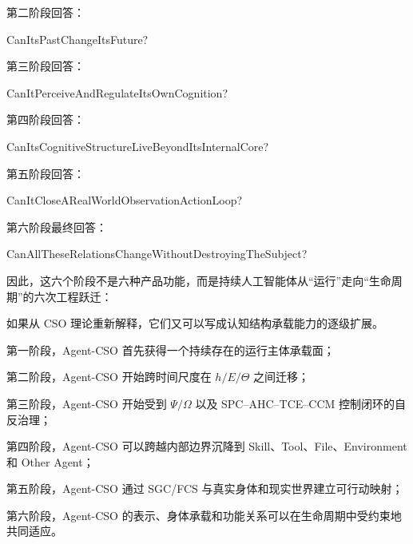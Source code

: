 第二阶段回答：

\begin{statementbox}
CanItsPastChangeItsFuture?
\end{statementbox}

第三阶段回答：

\begin{statementbox}
CanItPerceiveAndRegulateItsOwnCognition?
\end{statementbox}

第四阶段回答：

\begin{statementbox}
CanItsCognitiveStructureLiveBeyondItsInternalCore?
\end{statementbox}

第五阶段回答：

\begin{statementbox}
CanItCloseARealWorldObservationActionLoop?
\end{statementbox}

第六阶段最终回答：

\begin{statementbox}
CanAllTheseRelationsChangeWithoutDestroyingTheSubject?
\end{statementbox}

因此，这六个阶段不是六种产品功能，而是持续人工智能体从“运行”走向“生命周期”的六次工程跃迁：

\begin{statementbox}
\centering
{}
\end{statementbox}

如果从 CSO 理论重新解释，它们又可以写成认知结构承载能力的逐级扩展。

第一阶段，Agent-CSO 首先获得一个持续存在的运行主体承载面；

第二阶段，Agent-CSO 开始跨时间尺度在 \(h/E/\Theta\) 之间迁移；

第三阶段，Agent-CSO 开始受到 \(\Psi/\Omega\) 以及 SPC--AHC--TCE--CCM 控制闭环的自反治理；

第四阶段，Agent-CSO 可以跨越内部边界沉降到 Skill、Tool、File、Environment 和 Other Agent；

第五阶段，Agent-CSO 通过 SGC/FCS 与真实身体和现实世界建立可行动映射；

第六阶段，Agent-CSO 的表示、身体承载和功能关系可以在生命周期中受约束地共同适应。

